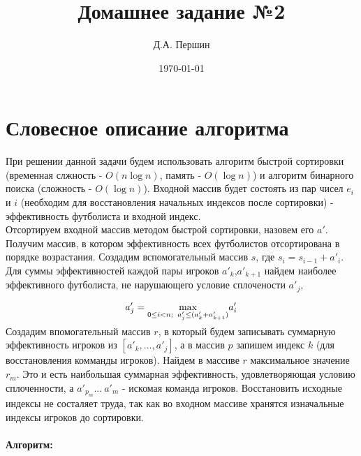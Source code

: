 \documentclass[12pt]{article}
\title{\bf Домашнее задание №2}
\author{Д.А. Першин}
\date{\today}
\begin{document}
\maketitle


\section{Словесное описание алгоритма}
При решении данной задачи будем использовать алгоритм быстрой сортировки (временная слжность - $O(n\log n)$, память - $O(\log n)$) и алгоритм бинарного поиска (сложность - $O(\log n)$). Входной массив будет состоять из пар чисел $e_i$ и $i$ (необходим для восстановления начальных индексов после сортировки) -  эффективность футболиста и входной индекс.\\

Отсортируем входной массив методом быстрой сортировки, назовем его $a'$. Получим массив, в котором эффективность всех футболистов отсортирована в порядке возрастания. Создадим вспомогательный массив $s$, где $s_i = s_{i-1} + a'_i$. Для суммы эффективностей каждой пары игроков $a'_k$,$a'_{k+1}$ найдем наиболее эффективного футболиста, не нарушающего условие сплочености $a'_j$, 

$$a'_j = \smash{\displaystyle\max_{0\le i < n;\;\; a'_j \leq (a'_k + a'_{k+1})}} a'_i$$ 

Создадим впомогательный массив $r$, в который будем записывать суммарную эффективность игроков из $[a'_k,..., a'_j]$, а в массив $p$ запишем индекс $k$ (для восстановления комманды игроков). Найдем в массиве $r$ максимальное значение $r_m$. Это и есть наибольшая суммарная эффективность, удовлетворяющая условию сплоченности, а $a'_{p_m} ...\ a'_m$ - искомая команда игроков. Восстановить исходные индексы не состаляет труда, так как во входном массиве хранятся изначальные индексы игроков до сортировки.


\paragraph{Алгоритм:}
\end{document}
